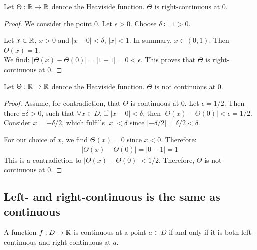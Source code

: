 \begin{theorem}
    Let $\Theta: \mathbb{R} \to \mathbb{R}$ denote the Heaviside function. $\Theta$ is right-continuous at $0$.
\end{theorem}

\begin{proof}
    We consider the point $0$. Let $\epsilon > 0$. Choose $\delta \coloneqq 1 > 0$.

    Let $x \in \mathbb{R}$, $x > 0$ and $|x - 0| < \delta$, \ie $|x| < 1$. In summary, $x\in (0,1)$. Then $\Theta(x) = 1$.\\
    We find: $|\Theta(x) - \Theta(0)| = |1 - 1| = 0 < \epsilon$. This proves that $\Theta$ is right-continuous at $0$.
\end{proof}


\begin{theorem}
    Let $\Theta: \mathbb{R} \to \mathbb{R}$ denote the Heaviside function. $\Theta$ is not continuous at $0$.
\end{theorem}

\begin{proof}
    Assume, for contradiction, that $\Theta$ is continuous at 0. Let $\epsilon = 1/2$. Then there $\exists \delta > 0$, such that $\forall x \in D$, if $|x - 0| < \delta$, then $|\Theta(x) - \Theta(0)| < \epsilon = 1/2$. Consider $\displaystyle x = -\delta/2$, which fulfills $|x| < \delta$ since $|- \delta / 2| = \delta / 2 < \delta$.

    For our choice of $x$, we find $\Theta(x) = 0$ since $x < 0$.
    Therefore:
    \begin{align*}
        |\Theta(x) - \Theta(0)| = |0 - 1| = 1
    \end{align*}
    This is a contradiction to $|\Theta(x) - \Theta(0)| < 1/2$. Therefore, $\Theta$ is not continuous at $0$.
\end{proof}




\pagebreak
\subsection{Left- and right-continuous is the same as continuous}

\begin{theorem}
    A function $f : D \to \mathbb{R}$ is continuous at a point $a \in D$ if and only if it is both left-continuous and right-continuous at $a$.
\end{theorem}

